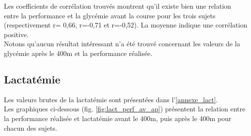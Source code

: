             Les coefficients de corrélation trouvés montrent qu'il existe bien une relation entre la performance et la glycémie avant la course pour les trois sujets (respectivement r= 0,66, r=-0,71 et r=-0,52). La moyenne indique une corrélation positive.\\
        
            Notons qu'aucun résultat intéressant n'a été trouvé concernant les valeurs de la glycémie après le 400m et la performance réalisée.\\
        
        
        \subsection{Lactatémie}
        \label{section:resLact}
        
            Les valeurs brutes de la lactatémie sont présentées dans l'\autoref{annexe_lact}.\\
            
            Les graphiques ci-dessous (fig. \ref{fig:lact_perf_av_ap}) présentent la relation entre la performance réalisée et lactatémie avant le 400m, puis après le 400m  pour chacun des sujets.\\
                   
